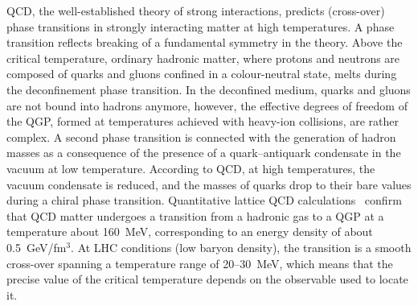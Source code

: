 QCD, the well-established theory of strong interactions, predicts (cross-over) phase transitions in strongly interacting matter at high temperatures. A phase transition reflects breaking of a fundamental symmetry in the theory. Above the critical temperature, ordinary hadronic matter, where protons and neutrons are composed of quarks and gluons confined in a colour-neutral state, melts during the deconfinement phase transition. In the deconfined medium, quarks and gluons are not bound into hadrons anymore, however, the effective degrees of freedom of the QGP, formed at temperatures achieved with heavy-ion collisions, are rather complex. A second phase transition is connected with the generation of hadron masses as a consequence of the presence of a quark--antiquark condensate in the vacuum at low temperature. According to QCD, at high temperatures, the vacuum condensate is reduced, and the masses of quarks drop to their bare values during a chiral phase transition. Quantitative lattice QCD calculations~\cite{Borsanyi:2010bp} confirm that QCD matter undergoes a transition from a hadronic gas to a QGP at a temperature about 160~MeV, corresponding to an energy density of about 0.5~GeV/fm$^3$. At LHC conditions (low baryon density), the transition is a smooth cross-over spanning a temperature range of 20--30~MeV, which means that the precise value of the critical temperature depends on the observable used to locate it.

